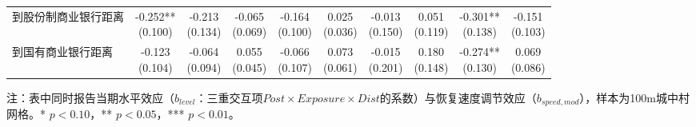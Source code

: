 \documentclass[a4paper,12pt]{report}
\begin{document}
\begin{table}[H]
{\begin{tabular}{lccccccccc}
到股份制商业银行距离 & \makecell{-0.252**\\(0.100)} & \makecell{-0.213\\(0.134)} & \makecell{-0.065\\(0.069)} & \makecell{-0.164\\(0.100)} & \makecell{0.025\\(0.036)} & \makecell{-0.013\\(0.150)} & \makecell{0.051\\(0.119)} & \makecell{-0.301**\\(0.138)} & \makecell{-0.151\\(0.103)} \\
到国有商业银行距离 & \makecell{-0.123\\(0.104)} & \makecell{-0.064\\(0.094)} & \makecell{0.055\\(0.045)} & \makecell{-0.066\\(0.107)} & \makecell{0.073\\(0.061)} & \makecell{-0.015\\(0.201)} & \makecell{0.180\\(0.148)} & \makecell{-0.274**\\(0.130)} & \makecell{0.069\\(0.086)} \\
\bottomrule
\end{tabular}}
\vspace{0.2cm}

\par\raggedright{} 注：表中同时报告当期水平效应（$b_{level}$：三重交互项$Post\times Exposure\times Dist$的系数）与恢复速度调节效应（$b_{speed,mod}$），样本为100m城中村网格。* $p<0.10$，** $p<0.05$，*** $p<0.01$。
\end{table}
\end{document}
